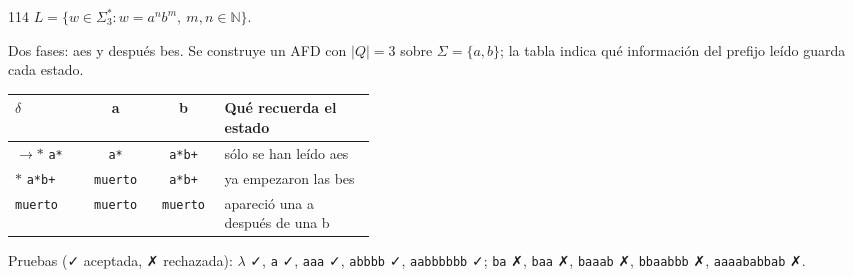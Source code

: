 \documentclass[11pt]{article}
\begin{document}
\begin{ejercicio}{114}{}
$L = \{w \in \Sigma_3^* : w = a^n b^m,\ m, n \in \mathbb{N}\}$.
\end{ejercicio}
\proc Dos fases: aes y después bes. Se construye un AFD con $|Q| = 3$ sobre $\Sigma = \{a, b\}$; la tabla indica qué información del prefijo leído guarda cada estado.
\begin{center}\small\begin{tabular}{lccp{0.42\linewidth}}\toprule
$\delta$ & a & b & Qué recuerda el estado \\\midrule
$\to$$*$ \texttt{a*} & \texttt{a*} & \texttt{a*b+} & sólo se han leído aes \\
$*$ \texttt{a*b+} & \texttt{muerto} & \texttt{a*b+} & ya empezaron las bes \\
 \texttt{muerto} & \texttt{muerto} & \texttt{muerto} & apareció una a después de una b \\
\bottomrule\end{tabular}\end{center}
Pruebas (✓ aceptada, ✗ rechazada): $\lambda$ ✓, \texttt{a} ✓, \texttt{aaa} ✓, \texttt{abbbb} ✓, \texttt{aabbbbbb} ✓; \texttt{ba} ✗, \texttt{baa} ✗, \texttt{baaab} ✗, \texttt{bbaabbb} ✗, \texttt{aaaababbab} ✗.
\end{document}
